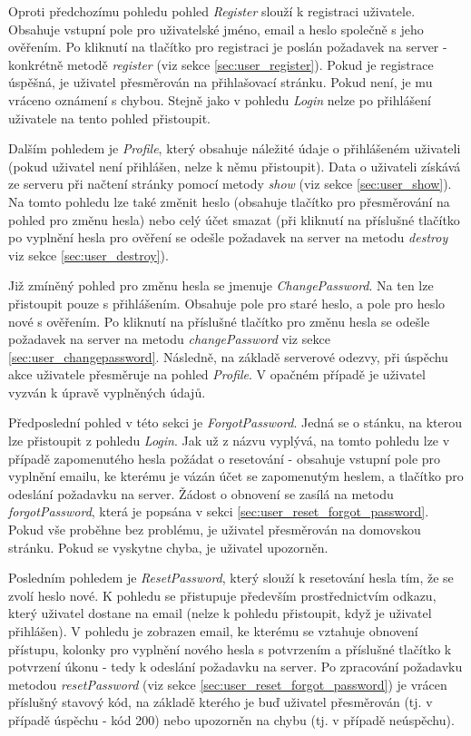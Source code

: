		Oproti předchozímu pohledu pohled \textit{Register} slouží k registraci uživatele. Obsahuje vstupní pole pro uživatelské jméno, email a heslo společně s jeho ověřením. Po kliknutí na tlačítko pro registraci je poslán požadavek na server - konkrétně metodě \textit{register} (viz sekce \ref{sec:user_register}). Pokud je registrace úspěšná, je uživatel přesměrován na přihlašovací stránku. Pokud není, je mu vráceno oznámení s chybou. Stejně jako v pohledu \textit{Login} nelze po přihlášení uživatele na tento pohled přistoupit. 
		
		Dalším pohledem je \textit{Profile}, který obsahuje náležité údaje o přihlášeném uživateli (pokud uživatel není přihlášen, nelze k němu přistoupit). Data o uživateli získává ze serveru při načtení stránky pomocí metody \textit{show} (viz sekce \ref{sec:user_show}). Na tomto pohledu lze také změnit heslo (obsahuje tlačítko pro přesměrování na pohled pro změnu hesla) nebo celý účet smazat (při kliknutí na příslušné tlačítko po vyplnění hesla pro ověření se odešle požadavek na server na metodu \textit{destroy} viz sekce \ref{sec:user_destroy}).
		
		Již zmíněný pohled pro změnu hesla se jmenuje \textit{ChangePassword}. Na ten lze přistoupit pouze s přihlášením. Obsahuje pole pro staré heslo, a pole pro heslo nové s ověřením. Po kliknutí na příslušné tlačítko pro změnu hesla se odešle požadavek na server na metodu \textit{changePassword} viz sekce \ref{sec:user_changepassword}. Následně, na základě serverové odezvy, při úspěchu akce uživatele přesměruje na pohled \textit{Profile}. V opačném případě je uživatel vyzván k úpravě vyplněných údajů.
		
		Předposlední pohled v této sekci je \textit{ForgotPassword}. Jedná se o stánku, na kterou lze přistoupit z pohledu \textit{Login}. Jak už z názvu vyplývá, na tomto pohledu lze v případě zapomenutého hesla požádat o resetování - obsahuje vstupní pole pro vyplnění emailu, ke kterému je vázán účet se zapomenutým heslem, a tlačítko pro odeslání požadavku na server. Žádost o obnovení se zasílá na metodu \textit{forgotPassword}, která je popsána v sekci \ref{sec:user_reset_forgot_password}. Pokud vše proběhne bez problému, je uživatel přesměrován na domovskou stránku. Pokud se vyskytne chyba, je uživatel upozorněn.
		
		Posledním pohledem je \textit{ResetPassword}, který slouží k resetování hesla tím, že se zvolí heslo nové. K pohledu se přistupuje především prostřednictvím odkazu, který uživatel dostane na email (nelze k pohledu přistoupit, když je uživatel přihlášen). V pohledu je zobrazen email, ke kterému se vztahuje obnovení přístupu, kolonky pro vyplnění nového hesla s potvrzením a příslušné tlačítko k potvrzení úkonu - tedy k odeslání požadavku na server. Po zpracování požadavku metodou \textit{resetPassword} (viz sekce \ref{sec:user_reset_forgot_password}) je vrácen příslušný stavový kód, na základě kterého je buď uživatel přesměrován (tj. v případě úspěchu - kód 200) nebo upozorněn na chybu (tj. v případě neúspěchu).
		
